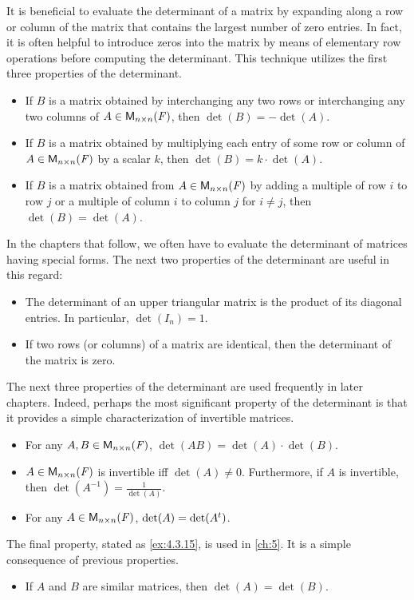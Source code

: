 \begin{note}
  It is beneficial to evaluate the determinant of a matrix by expanding along a row or column of the matrix that contains the largest number of zero entries.
  In fact, it is often helpful to introduce zeros into the matrix by means of elementary row operations before computing the determinant.
  This technique utilizes the first three properties of the determinant.
  \begin{itemize}
    \item If \(B\) is a matrix obtained by interchanging any two rows or interchanging any two columns of \(A \in \mathsf{M}_{{n} \times n}({\mathit{F}})\), then \(\det(B) = -\det(A)\).
    \item If \(B\) is a matrix obtained by multiplying each entry of some row or column of \(A \in \mathsf{M}_{{n} \times n}({\mathit{F}})\) by a scalar \(k\), then \(\det(B) = k \cdot \det(A)\).
    \item If \(B\) is a matrix obtained from \(A \in \mathsf{M}_{{n} \times n}({\mathit{F}})\) by adding a multiple of row \(i\) to row \(j\) or a multiple of column \(i\) to column \(j\) for \(i \neq j\), then \(\det(B) = \det(A)\).
  \end{itemize}
  In the chapters that follow, we often have to evaluate the determinant of matrices having special forms.
  The next two properties of the determinant are useful in this regard:
  \begin{itemize}
    \item The determinant of an upper triangular matrix is the product of its diagonal entries.
          In particular, \(\det(I_n) = 1\).
    \item If two rows (or columns) of a matrix are identical, then the determinant of the matrix is zero.
  \end{itemize}
  The next three properties of the determinant are used frequently in later chapters.
  Indeed, perhaps the most significant property of the determinant is that it provides a simple characterization of invertible matrices.
  \begin{itemize}
    \item For any \(A, B \in \mathsf{M}_{{n} \times n}({\mathit{F}})\), \(\det(AB) = \det(A) \cdot \det(B)\).
    \item \(A \in \mathsf{M}_{{n} \times n}({\mathit{F}})\) is invertible iff \(\det(A) \neq 0\).
          Furthermore, if \(A\) is invertible, then \(\det(A^{-1}) = \frac{1}{\det(A)}\).
    \item For any \(A \in \mathsf{M}_{{n} \times n}({\mathit{F}})\), \(\det(A) = \det({A}^{t})\).
  \end{itemize}
  The final property, stated as \cref{ex:4.3.15}, is used in \cref{ch:5}.
  It is a simple consequence of previous properties.
  \begin{itemize}
    \item If \(A\) and \(B\) are similar matrices, then \(\det(A) = \det(B)\).
  \end{itemize}
\end{note}

